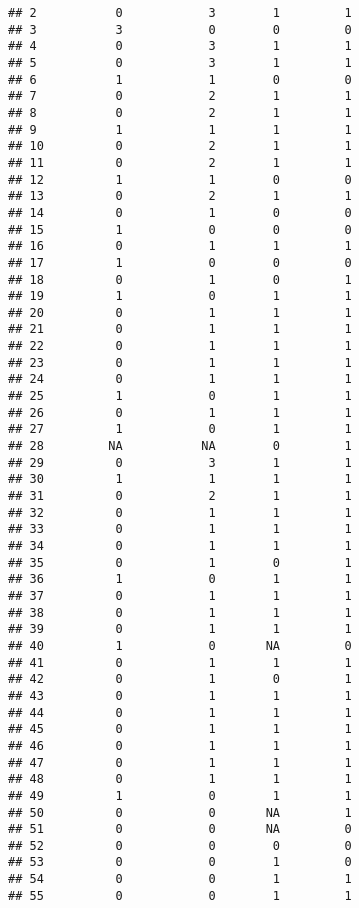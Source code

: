 \documentclass[
]{article}
\begin{document}
\begin{verbatim}
## 2           0            3        1         1
## 3           3            0        0         0
## 4           0            3        1         1
## 5           0            3        1         1
## 6           1            1        0         0
## 7           0            2        1         1
## 8           0            2        1         1
## 9           1            1        1         1
## 10          0            2        1         1
## 11          0            2        1         1
## 12          1            1        0         0
## 13          0            2        1         1
## 14          0            1        0         0
## 15          1            0        0         0
## 16          0            1        1         1
## 17          1            0        0         0
## 18          0            1        0         1
## 19          1            0        1         1
## 20          0            1        1         1
## 21          0            1        1         1
## 22          0            1        1         1
## 23          0            1        1         1
## 24          0            1        1         1
## 25          1            0        1         1
## 26          0            1        1         1
## 27          1            0        1         1
## 28         NA           NA        0         1
## 29          0            3        1         1
## 30          1            1        1         1
## 31          0            2        1         1
## 32          0            1        1         1
## 33          0            1        1         1
## 34          0            1        1         1
## 35          0            1        0         1
## 36          1            0        1         1
## 37          0            1        1         1
## 38          0            1        1         1
## 39          0            1        1         1
## 40          1            0       NA         0
## 41          0            1        1         1
## 42          0            1        0         1
## 43          0            1        1         1
## 44          0            1        1         1
## 45          0            1        1         1
## 46          0            1        1         1
## 47          0            1        1         1
## 48          0            1        1         1
## 49          1            0        1         1
## 50          0            0       NA         1
## 51          0            0       NA         0
## 52          0            0        0         0
## 53          0            0        1         0
## 54          0            0        1         1
## 55          0            0        1         1

\end{verbatim}
\end{document}
